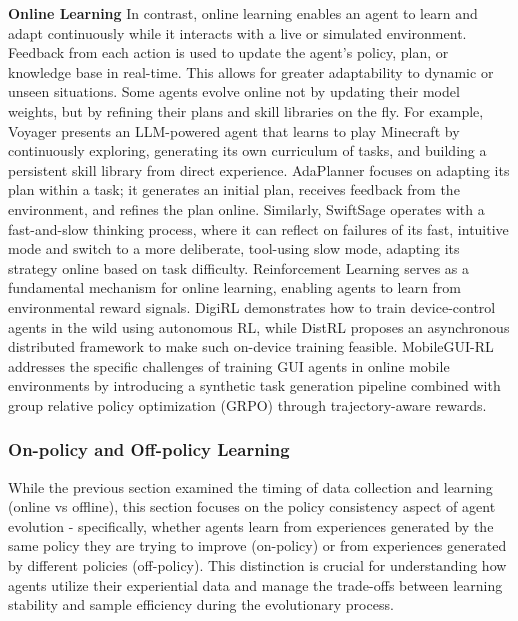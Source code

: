 \documentclass[10pt]{article} %
\begin{document}
\textbf{Online Learning}
In contrast, online learning enables an agent to learn and adapt continuously while it interacts with a live or simulated environment. Feedback from each action is used to update the agent’s policy, plan, or knowledge base in real-time. This allows for greater adaptability to dynamic or unseen situations.
Some agents evolve online not by updating their model weights, but by refining their plans and skill libraries on the fly. For example, Voyager\citep{wang2023voyager} presents an LLM-powered agent that learns to play Minecraft by continuously exploring, generating its own curriculum of tasks, and building a persistent skill library from direct experience.
AdaPlanner\citep{sun2023adaplanner} focuses on adapting its plan within a task; it generates an initial plan, receives feedback from the environment, and refines the plan online. Similarly, SwiftSage\citep{lin2023swiftsage} operates with a fast-and-slow thinking process, where it can reflect on failures of its fast, intuitive mode and switch to a more deliberate, tool-using slow mode, adapting its strategy online based on task difficulty.
Reinforcement Learning serves as a fundamental mechanism for online learning, enabling agents to learn from environmental reward signals. DigiRL\citep{bai2024digirl} demonstrates how to train device-control agents in the wild using autonomous RL, while DistRL\citep{wang2024distrl} proposes an asynchronous distributed framework to make such on-device training feasible. MobileGUI-RL\citep{shi2025mobileguirladvancingmobilegui} addresses the specific challenges of training GUI agents in online mobile environments by introducing a synthetic task generation pipeline combined with group relative policy optimization (GRPO) through trajectory-aware rewards.

\subsubsection{On-policy and Off-policy Learning}

While the previous section examined the timing of data collection and learning (online vs offline), this section focuses on the policy consistency aspect of agent evolution - specifically, whether agents learn from experiences generated by the same policy they are trying to improve (on-policy) or from experiences generated by different policies (off-policy). This distinction is crucial for understanding how agents utilize their experiential data and manage the trade-offs between learning stability and sample efficiency during the evolutionary process.
\end{document}
